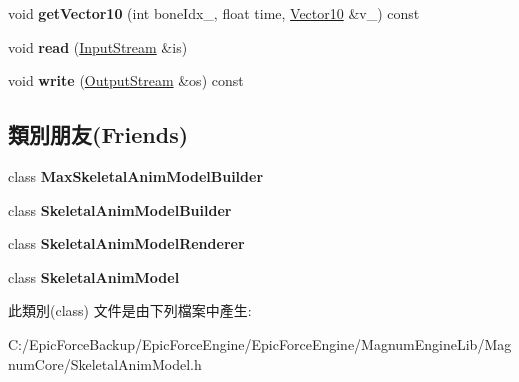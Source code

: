 \begin{DoxyCompactItemize}
\item 
void {\bfseries get\+Vector10} (int bone\+Idx\+\_\+, float time, \hyperlink{class_magnum_1_1_vector10}{Vector10} \&v\+\_\+) const \hypertarget{class_magnum_1_1endif_1_1_data_aec823de9ad12c37d070f6e38998e73ee}{}\label{class_magnum_1_1endif_1_1_data_aec823de9ad12c37d070f6e38998e73ee}

\item 
void {\bfseries read} (\hyperlink{class_magnum_1_1_input_stream}{Input\+Stream} \&is)\hypertarget{class_magnum_1_1endif_1_1_data_a7e012b4f2c9ed01fa67ac9d86e440315}{}\label{class_magnum_1_1endif_1_1_data_a7e012b4f2c9ed01fa67ac9d86e440315}

\item 
void {\bfseries write} (\hyperlink{class_magnum_1_1_output_stream}{Output\+Stream} \&os) const \hypertarget{class_magnum_1_1endif_1_1_data_af500566e2d0f03270c1a40ff565301e1}{}\label{class_magnum_1_1endif_1_1_data_af500566e2d0f03270c1a40ff565301e1}

\end{DoxyCompactItemize}
\subsection*{類別朋友(Friends)}
\begin{DoxyCompactItemize}
\item 
class {\bfseries Max\+Skeletal\+Anim\+Model\+Builder}\hypertarget{class_magnum_1_1endif_1_1_data_a68b08defd5651552ef2b6f922eee7ff9}{}\label{class_magnum_1_1endif_1_1_data_a68b08defd5651552ef2b6f922eee7ff9}

\item 
class {\bfseries Skeletal\+Anim\+Model\+Builder}\hypertarget{class_magnum_1_1endif_1_1_data_a31d58261bc4fbf7a6c1d2d2547437974}{}\label{class_magnum_1_1endif_1_1_data_a31d58261bc4fbf7a6c1d2d2547437974}

\item 
class {\bfseries Skeletal\+Anim\+Model\+Renderer}\hypertarget{class_magnum_1_1endif_1_1_data_ae50fe2cd824b9de98af4dd4aa51d4935}{}\label{class_magnum_1_1endif_1_1_data_ae50fe2cd824b9de98af4dd4aa51d4935}

\item 
class {\bfseries Skeletal\+Anim\+Model}\hypertarget{class_magnum_1_1endif_1_1_data_a88c72f2f6b125ba518843b71080035e5}{}\label{class_magnum_1_1endif_1_1_data_a88c72f2f6b125ba518843b71080035e5}

\end{DoxyCompactItemize}


此類別(class) 文件是由下列檔案中產生\+:\begin{DoxyCompactItemize}
\item 
C\+:/\+Epic\+Force\+Backup/\+Epic\+Force\+Engine/\+Epic\+Force\+Engine/\+Magnum\+Engine\+Lib/\+Magnum\+Core/Skeletal\+Anim\+Model.\+h\end{DoxyCompactItemize}
